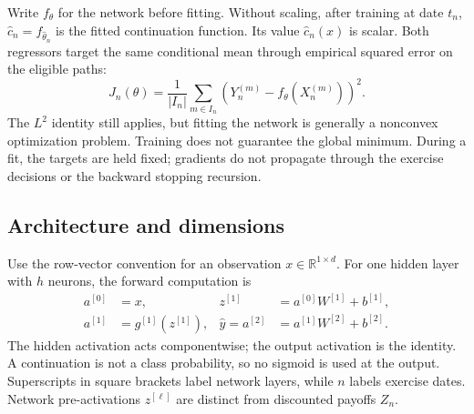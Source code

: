 \documentclass[11pt,a4paper]{article}
\newcommand{\R}{\mathbb R}
\begin{document}
Write $f_\theta$ for the network before fitting. Without scaling, after training
at date $t_n$, $\widehat c_n=f_{\widehat\theta_n}$ is the fitted continuation function.
Its value $\widehat c_n(x)$ is scalar. Both regressors target the same conditional
mean through empirical squared error on the eligible paths:
\begin{equation}
 J_n(\theta)=\frac1{|I_n|}\sum_{m\in I_n}
 \left(Y_n^{(m)}-f_\theta(X_n^{(m)})\right)^2.
\end{equation}
The $L^2$ identity still applies, but fitting the network is generally a nonconvex
optimization problem. Training does not guarantee the global minimum.
During a fit, the targets are held fixed; gradients do not propagate through
the exercise decisions or the backward stopping recursion.

\subsection{Architecture and dimensions}
Use the row-vector convention for an observation $x\in\R^{1\times d}$.
For one hidden layer with $h$ neurons, the forward computation is
\begin{equation}\label{eq:network}
 \begin{aligned}
 a^{[0]}&=x, & z^{[1]}&=a^{[0]}W^{[1]}+b^{[1]},\\
 a^{[1]}&=g^{[1]}(z^{[1]}), &
 \widehat y=a^{[2]}&=a^{[1]}W^{[2]}+b^{[2]}.
 \end{aligned}
\end{equation}
The hidden activation acts componentwise; the output activation is the identity.
A continuation is not a class probability, so no sigmoid is used at the output.
Superscripts in square brackets label network layers, while $n$ labels exercise
dates. Network pre-activations $z^{[\ell]}$ are distinct from discounted payoffs $Z_n$.
\end{document}
